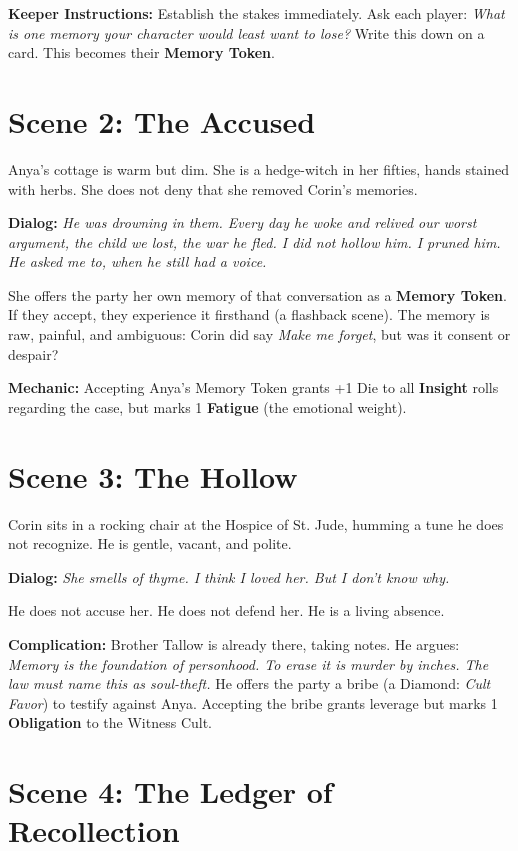 \documentclass[12pt]{book}
\begin{document}
\textbf{Keeper Instructions:} Establish the stakes immediately. Ask each player: \textit{What is one memory your character would least want to lose?} Write this down on a card. This becomes their \textbf{Memory Token}.

\section{Scene 2: The Accused}

Anya's cottage is warm but dim. She is a hedge-witch in her fifties, hands stained with herbs. She does not deny that she removed Corin's memories.

\textbf{Dialog:} \textit{He was drowning in them. Every day he woke and relived our worst argument, the child we lost, the war he fled. I did not hollow him. I pruned him. He asked me to, when he still had a voice.}

She offers the party her own memory of that conversation as a \textbf{Memory Token}. If they accept, they experience it firsthand (a flashback scene). The memory is raw, painful, and ambiguous: Corin did say \textit{Make me forget}, but was it consent or despair?

\textbf{Mechanic:} Accepting Anya's Memory Token grants +1 Die to all \textbf{Insight} rolls regarding the case, but marks 1 \textbf{Fatigue} (the emotional weight).

\section{Scene 3: The Hollow}

Corin sits in a rocking chair at the Hospice of St. Jude, humming a tune he does not recognize. He is gentle, vacant, and polite.

\textbf{Dialog:} \textit{She smells of thyme. I think I loved her. But I don't know why.}

He does not accuse her. He does not defend her. He is a living absence.

\textbf{Complication:} Brother Tallow is already there, taking notes. He argues: \textit{Memory is the foundation of personhood. To erase it is murder by inches. The law must name this as soul-theft.} He offers the party a bribe (a Diamond: \textit{Cult Favor}) to testify against Anya. Accepting the bribe grants leverage but marks 1 \textbf{Obligation} to the Witness Cult.

\section{Scene 4: The Ledger of Recollection}
\end{document}
